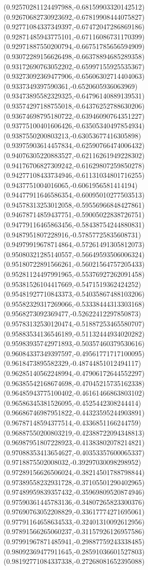 \documentclass[12pt]{article}
\theoremstyle{plain}
\theoremstyle{definition}
\theoremstyle{remark}
\begin{document}
\begin{figure}
{  (0.92570281124497988,-0.68159903320142512)%
  (0.92670682730923692,-0.67819908444075827)%
  (0.92771084337349397,-0.67472047286869186)%
  (0.92871485943775101,-0.67116086731170399)%
  (0.92971887550200794,-0.66751785656594909)%
  (0.93072289156626498,-0.66378894685289358)%
  (0.93172690763052202,-0.65997155925535367)%
  (0.93273092369477906,-0.65606302714404063)%
  (0.9337349397590361,-0.6520605936063969)%
  (0.93473895582329325,-0.64796140889139531)%
  (0.93574297188755018,-0.64376252788630206)%
  (0.93674698795180722,-0.63946090764351227)%
  (0.93775100401606426,-0.63505340497854934)%
  (0.9387550200803213,-0.63053677416305898)%
  (0.93975903614457834,-0.62590766474006432)%
  (0.94076305220883527,-0.62116261949228302)%
  (0.94176706827309242,-0.61629807259850278)%
  (0.94277108433734946,-0.61131034801716255)%
  (0.9437751004016065,-0.6061956581414194)%
  (0.94477911646586354,-0.60095010277503513)%
  (0.94578313253012058,-0.59556966848427861)%
  (0.94678714859437751,-0.59005022838726751)%
  (0.94779116465863456,-0.58438754244880831)%
  (0.9487951807228916,-0.57857725835608731)%
  (0.94979919678714864,-0.57261491305812073)%
  (0.95080321285140557,-0.56649593506006324)%
  (0.95180722891566261,-0.56021564757205433)%
  (0.95281124497991965,-0.55376927262091458)%
  (0.95381526104417669,-0.5471519362424252)%
  (0.95481927710843373,-0.54035867488103206)%
  (0.95582329317269066,-0.53338444313303168)%
  (0.9568273092369477,-0.52622412297850873)%
  (0.95783132530120474,-0.51887253465580707)%
  (0.95883534136546189,-0.51132444934020282)%
  (0.95983935742971893,-0.50357460379530616)%
  (0.96084337349397597,-0.49561771717100095)%
  (0.9618473895582329,-0.48744851012494117)%
  (0.96285140562248994,-0.47906172644552297)%
  (0.96385542168674698,-0.47045215735162338)%
  (0.96485943775100402,-0.46161466863803102)%
  (0.96586345381526095,-0.4525442308244414)%
  (0.96686746987951822,-0.44323595244903891)%
  (0.96787148594377514,-0.4336851166244759)%
  (0.96887550200803219,-0.42388722094348813)%
  (0.96987951807228923,-0.41383802078214821)%
  (0.97088353413654627,-0.40353357600065337)%
  (0.9718875502008032,-0.39297030098298952)%
  (0.97289156626506024,-0.38214501788798844)%
  (0.97389558232931728,-0.37105501290402965)%
  (0.97489959839357432,-0.35969809520874946)%
  (0.97590361445783136,-0.34807265823300376)%
  (0.97690763052208829,-0.33617774271695061)%
  (0.97791164658634533,-0.32401310092612956)%
  (0.97891566265060237,-0.31157926126957586)%
  (0.97991967871485941,-0.29887759243338485)%
  (0.98092369477911645,-0.28591036601527803)%
  (0.98192771084337338,-0.27268081652395088)%
}
\end{figure}
\end{document}
